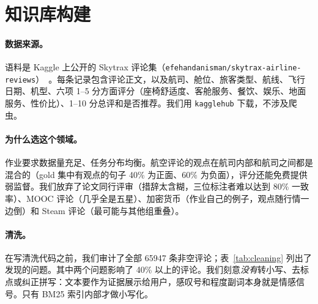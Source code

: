 \documentclass[10pt,twocolumn,a4paper]{article}
\begin{document}
\section{知识库构建}
\label{sec:kb}

\paragraph{数据来源。}语料是 Kaggle 上公开的 Skytrax 评论集（\nolinkurl{efehandanisman/skytrax-airline-reviews}）~\cite{skytraxkaggle}。每条记录包含评论正文，以及航司、舱位、旅客类型、航线、飞行日期、机型、六项 1--5 分方面评分（座椅舒适度、客舱服务、餐饮、娱乐、地面服务、性价比）、1--10 分总评和是否推荐。我们用 \texttt{kagglehub} 下载，不涉及爬虫。

\paragraph{为什么选这个领域。}作业要求数据量充足、任务分布均衡。航空评论的观点在航司内部和航司之间都是混合的（gold 集中有观点的句子 40\% 为正面、60\% 为负面），评分还能免费提供弱监督。我们放弃了论文同行评审（措辞太含糊，三位标注者难以达到 80\% 一致率）、MOOC 评论（几乎全是五星）、加密货币（作业自己的例子，观点随行情一边倒）和 Steam 评论（最可能与其他组重叠）。

\paragraph{清洗。}在写清洗代码之前，我们审计了全部 \num{65947} 条非空评论；表~\ref{tab:cleaning} 列出了发现的问题。其中两个问题影响了 40\% 以上的评论。我们刻意\emph{没有}转小写、去标点或纠正拼写：文本要作为证据展示给用户，感叹号和程度副词本身就是情感信号。只有 BM25 索引内部才做小写化。
\end{document}
